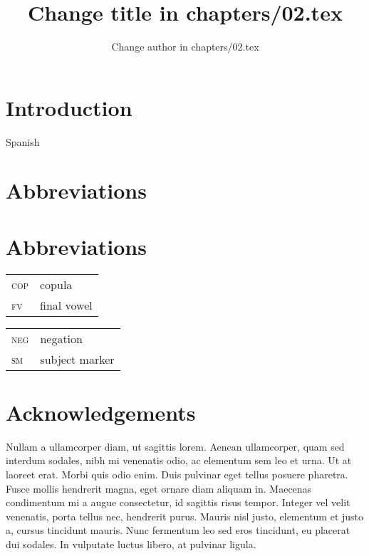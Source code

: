 \documentclass[output=paper]{langsci/langscibook}
\author{Change author in chapters/02.tex}
\title{Change title in chapters/02.tex}
\begin{document}
\section{Introduction}

Spanish \citep{Chomsky1957}


\section*{Abbreviations}

\section*{Abbreviations}
\begin{tabularx}{.45\textwidth}{lX}
\textsc{cop} & copula\\ 
\textsc{fv} & final vowel\\
\end{tabularx}
\begin{tabularx}{.45\textwidth}{lX}
\textsc{neg} & negation\\ 
\textsc{sm} & subject marker\\
\end{tabularx}

\section*{Acknowledgements}
Nullam a ullamcorper diam, ut sagittis lorem. Aenean ullamcorper, quam sed interdum sodales, nibh mi venenatis odio, ac elementum sem leo et urna. Ut at laoreet erat. Morbi quis odio enim. Duis pulvinar eget tellus posuere pharetra. Fusce mollis hendrerit magna, eget ornare diam aliquam in. Maecenas condimentum mi a augue consectetur, id sagittis risus tempor. Integer vel velit venenatis, porta tellus nec, hendrerit purus. Mauris nisl justo, elementum et justo a, cursus tincidunt mauris. Nunc fermentum leo sed eros tincidunt, eu placerat dui sodales. In vulputate luctus libero, at pulvinar ligula. 

{\sloppy
\printbibliography[heading=subbibliography,notkeyword=this]
}
\end{document}
